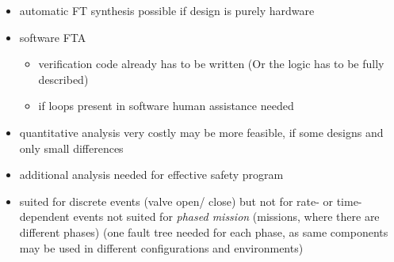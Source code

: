 \documentclass[a4paper, 10pt]{article}
\begin{document}
\begin{itemize}
\begin{center}
    \end{center}
    \item automatic FT synthesis possible if design is purely hardware
    \item software FTA
    \begin{itemize}
        \item verification \follows code already has to be written {\tiny (Or the logic has to be fully described)}
        \item if loops present in software \follows human assistance needed
    \end{itemize}
    \item quantitative analysis very costly \follows may be more feasible, if some designs and only small differences
    \item additional analysis needed for effective safety program
    \item suited for discrete events (valve open/ close) but not for rate- or time- dependent events
    \bad not suited for \emph{phased mission} (missions, where there are different phases) (one fault tree needed for each phase, as same components may be used in different configurations and environments)
\end{itemize}
\end{document}
